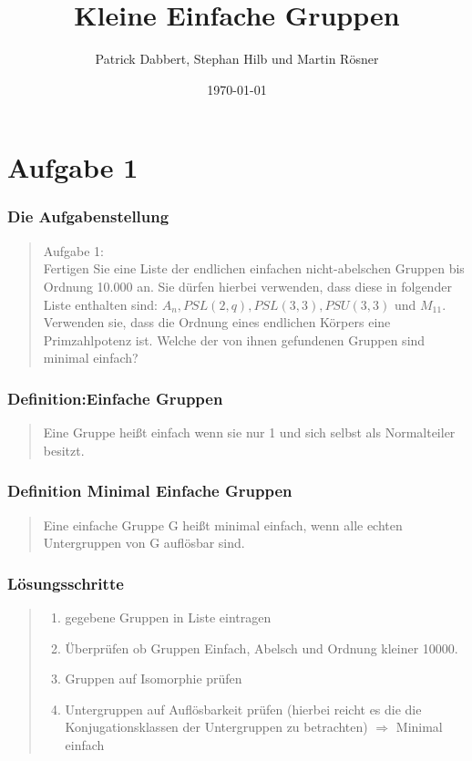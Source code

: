 \documentclass{beamer}
\title{Kleine Einfache Gruppen}
\author{Patrick Dabbert, Stephan Hilb und Martin R\"osner}
\date{\today}
\begin{document}
\begin{frame}
	\titlepage
\end{frame}


\section{Aufgabe 1}

\begin{frame}
	\frametitle{Die Aufgabenstellung}
	\begin{quote}
	Aufgabe 1:\\
	Fertigen Sie eine Liste der endlichen einfachen nicht-abelschen Gruppen bis Ordnung 10.000 an.
	Sie dürfen hierbei verwenden, dass diese in folgender Liste enthalten sind: $A_n, PSL(2,q), PSL(3,3),
	PSU(3,3)$ und $M_{11}$. Verwenden sie, dass die Ordnung eines endlichen Körpers eine Primzahlpotenz ist.
	Welche der von ihnen gefundenen Gruppen sind minimal einfach?
		 
	\end{quote}
\end{frame}



\begin{frame}
	\frametitle{Definition:Einfache Gruppen}
	\begin{quote}
	 Eine Gruppe heißt einfach wenn sie nur 1 und sich selbst als Normalteiler besitzt.
		 
	\end{quote}
\end{frame}
\begin{frame}
	\frametitle{Definition Minimal Einfache Gruppen}
	\begin{quote}
	 Eine einfache Gruppe G heißt minimal einfach, wenn alle echten Untergruppen von G auflösbar sind.
	\end{quote}
\end{frame}

\begin{frame}
	\frametitle{Lösungsschritte}
	\begin{quote}
	 \begin{enumerate}[1.]
	  \item gegebene Gruppen in Liste eintragen
	  \item Überprüfen ob Gruppen Einfach, Abelsch und Ordnung kleiner 10000.
	  \item Gruppen auf Isomorphie prüfen
	  \item Untergruppen auf Auflösbarkeit prüfen (hierbei reicht es die die Konjugationsklassen der Untergruppen
	  zu betrachten) $\Rightarrow$ Minimal einfach
	 \end{enumerate}

		 
	\end{quote}
\end{frame}
\end{document}
